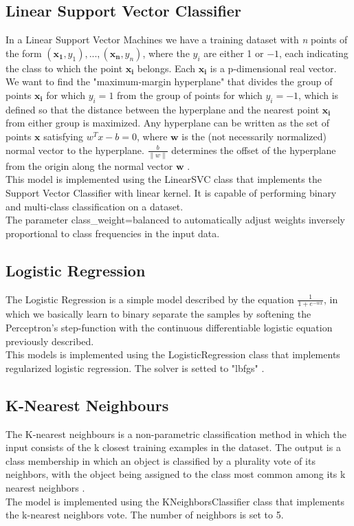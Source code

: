 \documentclass[10.5pt]{article}
\begin{document}
\begin{multicols*}{2}
\subsection{Linear Support Vector Classifier}
In a Linear Support Vector Machines we have a training dataset with \textit{n} points of the form $(\boldsymbol{x_{1}}, y_{1}),...,(\boldsymbol{x_{n}},y_{n})$, where the $y_{i}$ are either 1 or $-1$, each indicating the class to which the point $\boldsymbol{x_{i}}$ belongs. Each $\boldsymbol{x_{i}}$ is a  p-dimensional real vector. We want to find the "maximum-margin hyperplane" that divides the group of points $\boldsymbol{x_{i}}$ for which $y_{i}=1$ from the group of points for which $y_{i}=-1$, which is defined so that the distance between the hyperplane and the nearest point $\boldsymbol{x_{i}}$ from either group is maximized. Any hyperplane can be written as the set of points $\boldsymbol{x}$ satisfying $w^{T}x-b=0$, where $\boldsymbol{w}$ is the (not necessarily normalized) normal vector to the hyperplane. $\frac{b}{\lVert w \lVert}$ determines the offset of the hyperplane from the origin along the normal vector $\boldsymbol{w}$ \cite{lsvc}.\\
This model is implemented using the LinearSVC class that implements the Support Vector Classifier with linear kernel. It is capable of performing binary and multi-class classification on a dataset.\\
The parameter class\_weight=balanced to automatically adjust weights inversely proportional to class frequencies in the input data.

\subsection{Logistic Regression}

The Logistic Regression is a simple model described by the equation $\frac{1}{1+e^{-wx}}$, in which we basically learn to binary separate the samples by softening the Perceptron's step-function with the continuous differentiable logistic equation previously described.\\
This models is implemented using the LogisticRegression class that implements regularized logistic regression. The solver is setted to "lbfgs" \cite{LogisticRegression}. 

\subsection{K-Nearest Neighbours}
The K-nearest neighbours is a non-parametric classification method in which the input consists of the k closest training examples in the dataset. The output is a class membership in which an object is classified by a plurality vote of its neighbors, with the object being assigned to the class most common among its k nearest neighbors \cite{KNearestNeightbours}.\\
The model is implemented using the KNeighborsClassifier class that implements the k-nearest neighbors vote.
The number of neighbors is set to 5.


\end{multicols*}
\end{document}

